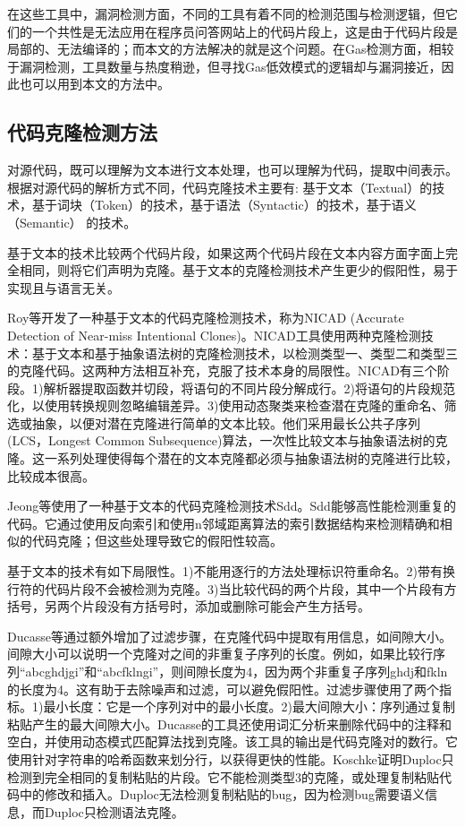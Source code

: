 在这些工具中，漏洞检测方面，不同的工具有着不同的检测范围与检测逻辑，但它们的一个共性是无法应用在程序员问答网站上的代码片段上，这是由于代码片段是局部的、无法编译的；而本文的方法解决的就是这个问题。在Gas检测方面，相较于漏洞检测，工具数量与热度稍逊，但寻找Gas低效模式的逻辑却与漏洞接近，因此也可以用到本文的方法中。

\subsection{代码克隆检测方法}

对源代码，既可以理解为文本进行文本处理，也可以理解为代码，提取中间表示。根据对源代码的解析方式不同，代码克隆技术主要有: 基于文本（Textual）的技
术，基于词块（Token）的技术，基于语法（Syntactic）的技术，基于语义（Semantic）
的技术。

基于文本的技术比较两个代码片段，如果这两个代码片段在文本内容方面字面上完全相同，则将它们声明为克隆。基于文本的克隆检测技术产生更少的假阳性，易于实现且与语言无关。

Roy等\cite{nicad}开发了一种基于文本的代码克隆检测技术，称为NICAD (Accurate Detection of Near-miss Intentional Clones)。NICAD工具\cite{clone13}使用两种克隆检测技术：基于文本和基于抽象语法树的克隆检测技术，以检测类型一、类型二和类型三的克隆代码。这两种方法相互补充，克服了技术本身的局限性。NICAD有三个阶段。1)解析器提取函数并切段，将语句的不同片段分解成行。2)将语句的片段规范化，以使用转换规则忽略编辑差异。3)使用动态聚类来检查潜在克隆的重命名、筛选或抽象，以便对潜在克隆进行简单的文本比较。他们采用最长公共子序列(LCS，Longest Common Subsequence)算法，一次性比较文本与抽象语法树的克隆。这一系列处理使得每个潜在的文本克隆都必须与抽象语法树的克隆进行比较，比较成本很高。

Jeong等\cite{sdd}使用了一种基于文本的代码克隆检测技术Sdd。Sdd能够高性能检测重复的代码。它通过使用反向索引\cite{clone57}和使用n邻域距离算法\cite{clone57}的索引数据结构来检测精确和相似的代码克隆；但这些处理导致它的假阳性较高。

基于文本的技术\cite{clone4}\cite{clone8}\cite{clone10}有如下局限性。1)不能用逐行的方法处理标识符重命名。2)带有换行符的代码片段不会被检测为克隆。3)当比较代码的两个片段，其中一个片段有方括号，另两个片段没有方括号时，添加或删除可能会产生方括号。

Ducasse等\cite{Ducasse}通过额外增加了过滤步骤，在克隆代码中提取有用信息，如间隙大小。间隙大小可以说明一个克隆对之间的非重复子序列的长度。例如，如果比较行序列“abcghdjgi”和“abcfklngi”，则间隙长度为4，因为两个非重复子序列ghdj和fkln的长度为4。这有助于去除噪声和过滤，可以避免假阳性。过滤步骤使用了两个指标。1)最小长度：它是一个序列对中的最小长度。2)最大间隙大小：序列通过复制粘贴产生的最大间隙大小。Ducasse的工具还使用词汇分析来删除代码中的注释和空白，并使用动态模式匹配算法找到克隆。该工具的输出是代码克隆对的数行。它使用针对字符串的哈希函数来划分行，以获得更快的性能。Koschke\cite{Koschke}证明Duploc只检测到完全相同的复制粘贴的片段。它不能检测类型3的克隆，或处理复制粘贴代码中的修改和插入。Duploc无法检测复制粘贴的bug，因为检测bug需要语义信息，而Duploc只检测语法克隆。

